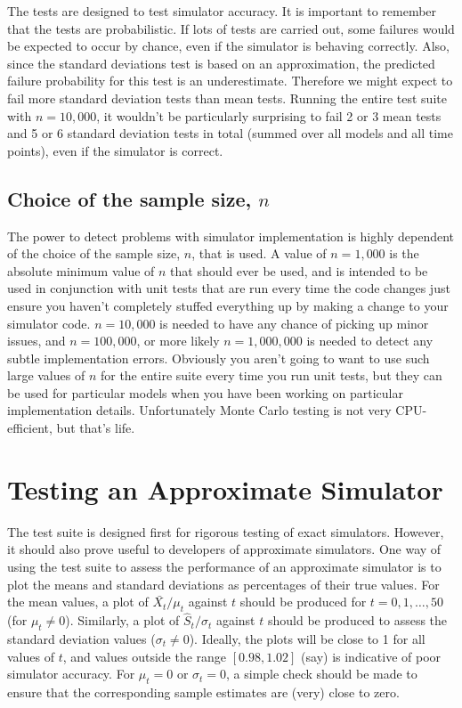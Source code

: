 \documentclass[12pt,a4paper]{article}
\begin{document}
The tests are designed to test simulator accuracy. It is important to
remember that the tests are probabilistic. If lots of tests are
carried out, some failures would be expected to occur by chance, even
if the simulator is behaving correctly. Also, since the standard
deviations test is based on an approximation, the predicted failure
probability for this test is an underestimate. Therefore we might
expect to fail more standard deviation tests than mean tests. Running
the entire test suite with $n=10,000$, it wouldn't be particularly
surprising to fail 2 or 3 mean tests and 5 or 6 standard deviation
tests in total (summed over all models and all time points), even if
the simulator is correct.

\subsection{Choice of the sample size, $n$}
\label{sec:ss}

The power to detect problems with simulator implementation is highly
dependent of the choice of the sample size, $n$, that is used. A value
of $n=1,000$ is the absolute minimum value of $n$ that should ever be used,
and is intended to be used in conjunction with unit tests that are run
every time the code changes just ensure you haven't completely stuffed
everything up by making a change to your simulator code. $n=10,000$ is
needed to have any chance of picking up minor issues, and $n=100,000$,
or more likely $n=1,000,000$ is needed to detect any subtle
implementation errors. Obviously you aren't going to want to use such
large values of $n$ for the entire suite every time you run unit tests,
but they can be used for particular models when you have been working
on particular implementation details. Unfortunately Monte Carlo
testing is not very CPU-efficient, but that's life.

\section{Testing an Approximate Simulator}

The test suite is designed first for rigorous testing of exact
simulators. However, it should also prove useful to developers of
approximate simulators. One way of using the test suite to assess the
performance of an approximate simulator is to plot the means and
standard deviations as percentages of their true values. For the mean
values, a plot of $\bar{X_t}/\mu_t$ against $t$ should be produced for
$t=0,1,\ldots,50$ (for $\mu_t\not=0$). Similarly, a plot of
$\hat{S}_t/\sigma_t$ against $t$ should be produced to assess the
standard deviation values ($\sigma_t\not=0$). Ideally, the plots will
be close to 1 for all values of $t$, and values outside the range
$[0.98,1.02]$ (say) is indicative of poor simulator accuracy. For
$\mu_t=0$ or $\sigma_t=0$, a simple check should be made to ensure
that the corresponding sample estimates are (very) close to zero.
\end{document}
